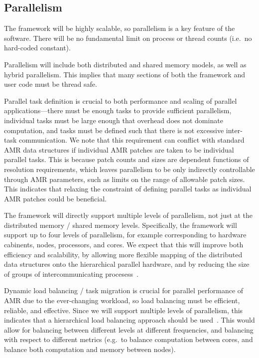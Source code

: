 \documentclass{article}
\begin{document}
\subsection{Parallelism}

The framework will be highly scalable, so parallelism is a key
feature of the software.  There will be no fundamental limit on
process or thread counts (i.e.~no hard-coded  constant).

Parallelism will include both distributed and shared memory models, as
well as hybrid parallelism.  This implies that many sections of both
the framework and user code must be thread safe.

Parallel task definition is crucial to both performance and scaling of
parallel applications---there must be enough tasks to provide
sufficient parallelism, individual tasks must be large enough that
overhead does not dominate computation, and tasks must be defined such
that there is not excessive inter-task communication.  We note that
this requirement can conflict with standard AMR data structures if
individual AMR patches are taken to be individual parallel tasks.
This is because patch counts and sizes are dependent functions of
resolution requirements, which leaves parallelism to be only
indirectly controllable through AMR parameters, such as limits on the
range of allowable patch sizes.  This indicates that relaxing the
constraint of defining parallel tasks as individual AMR patches could
be beneficial.

The framework will directly support multiple levels of parallelism,
not just at the distributed memory / shared memory levels.
Specifically, the framework will support up to four levels of
parallelism, for example corresponding to hardware cabinents, nodes,
processors, and cores.  We expect that this will improve both
efficiency and scalability, by allowing more flexible mapping of the
distributed data structures onto the hierarchical parallel hardware,
and by reducing the size of groups of intercommunicating
procesess~\cite{BaBu09}.

Dynamic load balancing / task migration is crucial for parallel performance
of AMR due to the ever-changing workload, so load balancing must be
efficient, reliable, and effective.  Since we will support multiple
levels of parallelism, this indicates that a hierarchical load balancing 
approach should be used~\cite{LaTa06}.  This would allow for balancing between different levels at different frequencies, and balancing with respect to
different metrics (e.g.~to balance computation between cores, and balance
both computation and memory between nodes).
\end{document}
